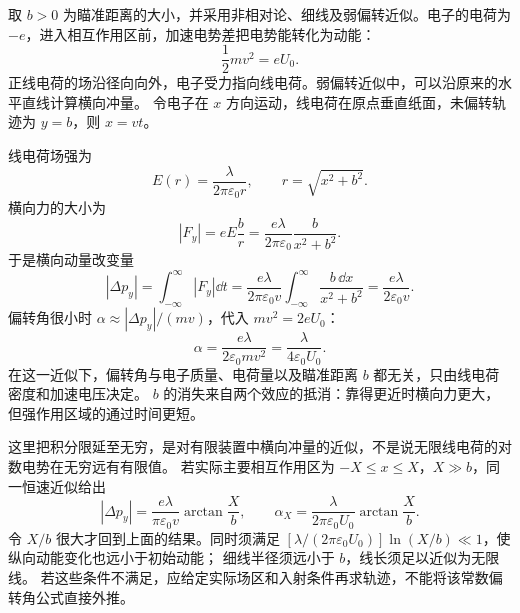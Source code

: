 \begin{xesolution}
取 $b>0$ 为瞄准距离的大小，并采用非相对论、细线及弱偏转近似。电子的电荷为 $-e$，进入相互作用区前，加速电势差把电势能转化为动能：
\[
  \frac12mv^2=eU_0.
\]
正线电荷的场沿径向向外，电子受力指向线电荷。弱偏转近似中，可以沿原来的水平直线计算横向冲量。
令电子在 $x$ 方向运动，线电荷在原点垂直纸面，未偏转轨迹为 $y=b$，则 $x=vt$。

\electronLensFigure

线电荷场强为
\[
  E(r)=\frac{\lambda}{2\pi\varepsilon_0r},
  \qquad r=\sqrt{x^2+b^2}.
\]
横向力的大小为
\[
  |F_y|=eE\frac{b}{r}
  =\frac{e\lambda}{2\pi\varepsilon_0}
  \frac{b}{x^2+b^2}.
\]
于是横向动量改变量
\[
  |\Delta p_y|
  =\int_{-\infty}^{\infty}|F_y|\dd t
  =\frac{e\lambda}{2\pi\varepsilon_0v}
  \int_{-\infty}^{\infty}\frac{b\,\dd x}{x^2+b^2}
  =\frac{e\lambda}{2\varepsilon_0v}.
\]
偏转角很小时 $\alpha\approx|\Delta p_y|/(mv)$，代入 $mv^2=2eU_0$：
\[
  \boxed{\alpha=\frac{e\lambda}{2\varepsilon_0mv^2}
  =\frac{\lambda}{4\varepsilon_0U_0}}.
\]
在这一近似下，偏转角与电子质量、电荷量以及瞄准距离 $b$ 都无关，只由线电荷密度和加速电压决定。
$b$ 的消失来自两个效应的抵消：靠得更近时横向力更大，但强作用区域的通过时间更短。

这里把积分限延至无穷，是对有限装置中横向冲量的近似，不是说无限线电荷的对数电势在无穷远有有限值。
若实际主要相互作用区为 $-X\le x\le X$，$X\gg b$，同一恒速近似给出
\[
 |\Delta p_y|=\frac{e\lambda}{\pi\varepsilon_0v}\arctan\frac Xb,
 \qquad \alpha_X=\frac{\lambda}{2\pi\varepsilon_0U_0}\arctan\frac Xb.
\]
令 $X/b$ 很大才回到上面的结果。同时须满足
$[\lambda/(2\pi\varepsilon_0U_0)]\ln(X/b)\ll1$，使纵向动能变化也远小于初始动能；
细线半径须远小于 $b$，线长须足以近似为无限线。
若这些条件不满足，应给定实际场区和入射条件再求轨迹，不能将该常数偏转角公式直接外推。
\end{xesolution}

